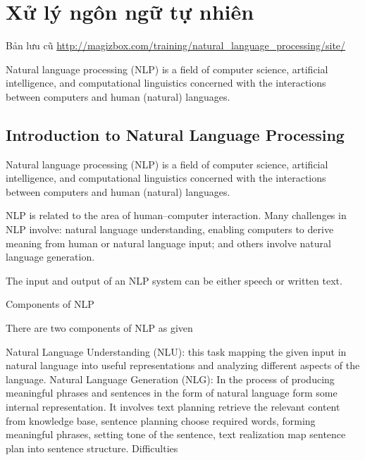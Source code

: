\chapter{Xử lý ngôn ngữ tự nhiên}

Bản lưu cũ \href{http://magizbox.com/training/natural_language_processing/site/}{http://magizbox.com/training/natural\_language\_processing/site/}



Natural language processing (NLP) is a field of computer science, artificial intelligence, and computational linguistics concerned with the interactions between computers and human (natural) languages.

\section{Introduction to Natural Language Processing}

Natural language processing (NLP) is a field of computer science, artificial intelligence, and computational linguistics concerned with the interactions between computers and human (natural) languages.

NLP is related to the area of human–computer interaction. Many challenges in NLP involve: natural language understanding, enabling computers to derive meaning from human or natural language input; and others involve natural language generation.

The input and output of an NLP system can be either speech or written text.

Components of NLP

There are two components of NLP as given

Natural Language Understanding (NLU): this task mapping the given input in natural language into useful representations and analyzing different aspects of the language.
Natural Language Generation (NLG): In the process of producing meaningful phrases and sentences in the form of natural language form some internal representation. It involves text planning retrieve the relevant content from knowledge base, sentence planning choose required words, forming meaningful phrases, setting tone of the sentence, text realization map sentence plan into sentence structure.
Difficulties

